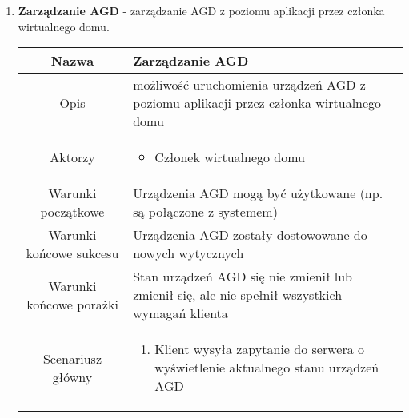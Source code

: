 \documentclass{article}
\begin{document}
\begin{enumerate}
\begin{enumerate}
			\item \textbf{Zarządzanie AGD} - zarządzanie AGD z poziomu aplikacji przez
				członka wirtualnego domu.
				\begin{table}[H]
					\centering
					\begin{tabular}{|c|p{7cm}|}
						\hline
						Nazwa                   & \textbf{Zarządzanie AGD}                                                                                                                                                                                                                                                           \\
						\hline
						Opis                    & możliwość uruchomienia urządzeń AGD z poziomu aplikacji przez członka wirtualnego domu                                                                                                                                                                                             \\
						\hline
						Aktorzy                 & \begin{itemize}\item Członek wirtualnego domu\end{itemize}                                                                                                                                                                                                                         \\
						\hline
						Warunki początkowe      & Urządzenia AGD mogą być użytkowane (np. są połączone z systemem)                                                                                                                                                                                                                   \\
						\hline
						Warunki końcowe sukcesu & Urządzenia AGD zostały dostowowane do nowych wytycznych                                                                                                                                                                                                                            \\
						\hline
						Warunki końcowe porażki & Stan urządzeń AGD się nie zmienił lub zmienił się, ale nie spełnił wszystkich wymagań klienta                                                                                                                                                                                      \\
						\hline
						Scenariusz główny       & \begin{enumerate}\item Klient wysyła zapytanie do serwera o wyświetlenie aktualnego stanu urządzeń AGD


\end{enumerate}
\end{tabular}
\end{table}
\end{enumerate}
\end{enumerate}
\end{document}
